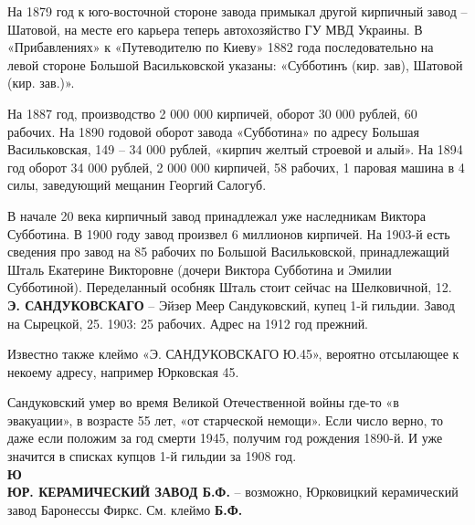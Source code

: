 На 1879 год к юго-восточной стороне завода примыкал другой кирпичный завод – Шатовой, на месте его карьера теперь автохозяйство ГУ МВД Украины. В «Прибавлениях» к «Путеводителю по Киеву» 1882 года последовательно на левой стороне Большой Васильковской указаны: «Субботинъ (кир. зав), Шатовой (кир. зав.)».

На 1887 год, производство 2 000 000 кирпичей, оборот 30 000 рублей, 60 рабочих. На 1890 годовой оборот завода «Субботина» по адресу Большая Васильковская, 149 – 34 000 рублей, «кирпич желтый строевой и алый». На 1894 год оборот 34 000 рублей, 2 000 000 кирпичей, 58 рабочих, 1 паровая машина в 4 силы, заведующий мещанин Георгий Салогуб.

В начале 20 века кирпичный завод принадлежал уже наследникам Виктора Субботина. В 1900 году завод произвел 6 миллионов кирпичей. На 1903-й есть сведения про завод на 85 рабочих по Большой Васильковской, принадлежащий Шталь Екатерине Викторовне (дочери Виктора Субботина и Эмилии Субботиной). Переделанный особняк Шталь стоит сейчас на Шелковичной, 12.\\

\noindent\textbf{Э. САНДУКОВСКАГО} – Эйзер Меер Сандуковский, купец 1-й гильдии. Завод на Сырецкой, 25. 1903: 25 рабочих. Адрес на 1912 год прежний.

Известно также клеймо «Э. САНДУКОВСКАГО Ю.45», вероятно отсылающее к некоему адресу, например Юрковская 45.

Сандуковский умер во время Великой Отечественной войны где-то «в эвакуации», в возрасте 55 лет, «от старческой немощи». Если число верно, то даже если положим за год смерти 1945, получим год рождения 1890-й. И уже значится в списках купцов 1-й гильдии за 1908 год.\\

\noindent\textbf{Ю}\\

\noindent\textbf{ЮР. КЕРАМИЧЕСКИЙ ЗАВОД Б.Ф.} – возможно, Юрковицкий керамический завод Баронессы Фиркс. См. клеймо \textbf{Б.Ф.}\\

